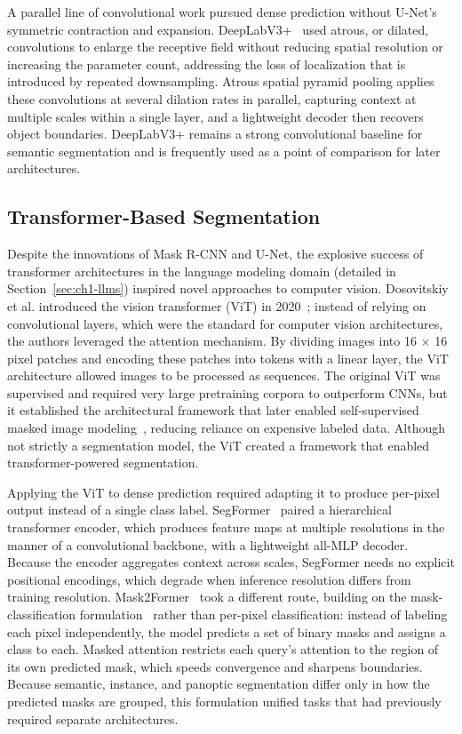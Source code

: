 A parallel line of convolutional work pursued dense prediction without U-Net's symmetric contraction and expansion. DeepLabV3+~\cite{chen2018encoder} used atrous, or dilated, convolutions to enlarge the receptive field without reducing spatial resolution or increasing the parameter count, addressing the loss of localization that is introduced by repeated downsampling. Atrous spatial pyramid pooling applies these convolutions at several dilation rates in parallel, capturing context at multiple scales within a single layer, and a lightweight decoder then recovers object boundaries. DeepLabV3+ remains a strong convolutional baseline for semantic segmentation and is frequently used as a point of comparison for later architectures.

\subsection{Transformer-Based Segmentation}\label{sec:ch1-tfseg}
Despite the innovations of Mask R-CNN and U-Net, the explosive success of transformer architectures in the language modeling domain (detailed in Section~\ref{sec:ch1-llms}) inspired novel approaches to computer vision. Dosovitskiy et al. introduced the vision transformer (ViT) in 2020~\cite{dosovitskiy2020image}; instead of relying on convolutional layers, which were the standard for computer vision architectures, the authors leveraged the attention mechanism. By dividing images into 16 $\times$ 16 pixel patches and encoding these patches into tokens with a linear layer, the ViT architecture allowed images to be processed as sequences. The original ViT was supervised and required very large pretraining corpora to outperform CNNs, but it established the architectural framework that later enabled self-supervised masked image modeling~\cite{he2022masked}, reducing reliance on expensive labeled data. Although not strictly a segmentation model, the ViT created a framework that enabled transformer-powered segmentation.

Applying the ViT to dense prediction required adapting it to produce per-pixel output instead of a single class label. SegFormer~\cite{xie2021segformer} paired a hierarchical transformer encoder, which produces feature maps at multiple resolutions in the manner of a convolutional backbone, with a lightweight all-MLP decoder. Because the encoder aggregates context across scales, SegFormer needs no explicit positional encodings, which degrade when inference resolution differs from training resolution. Mask2Former~\cite{cheng2022masked} took a different route, building on the mask-classification formulation~\cite{cheng2021per} rather than per-pixel classification: instead of labeling each pixel independently, the model predicts a set of binary masks and assigns a class to each. Masked attention restricts each query's attention to the region of its own predicted mask, which speeds convergence and sharpens boundaries. Because semantic, instance, and panoptic segmentation differ only in how the predicted masks are grouped, this formulation unified tasks that had previously required separate architectures.

